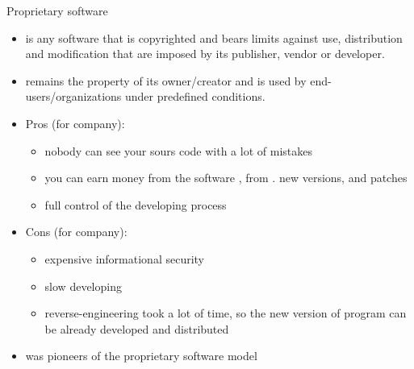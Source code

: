 \documentclass[usenames,dvipsnames,10pt,aspectratio=169]{beamer}
\begin{document}

\begin{frame}{Proprietary software}
    \begin{itemize}
        \item {} is any software that is copyrighted and bears limits against use, distribution and modification that are imposed by its publisher, vendor or developer. 
        \item {} remains the property of its owner/creator and is used by end-users/organizations under predefined conditions.
        \item Pros (for company):
            \begin{itemize}
                \item nobody can see your sours code with a lot of mistakes
                \item you can earn money from the software , from . new versions,  and patches
                \item full control of the developing process
            \end{itemize}
        \item Cons (for company):
            \begin{itemize}
                \item expensive informational security
                \item slow developing 
                \item reverse-engineering took a lot of time, so the new version of program can be already developed and distributed
            \end{itemize}
        \item {} was pioneers of the proprietary software model
    \end{itemize}
\end{frame}
\end{document}
